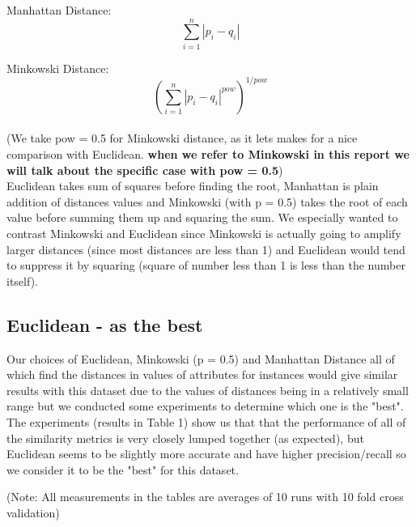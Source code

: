 Manhattan Distance:
\begin{equation}
\sum_{i=1}^{n} |p_{i} - q_{i}|
\end{equation}

Minkowski Distance:
\begin{equation}
{(\sum_{i=1}^{n} {|p_{i} - q_{i}|}^{pow})}^{1/pow}
\end{equation}
\\
(We take pow = 0.5 for Minkowski distance, as it lets makes for a nice comparison with Euclidean. {\bf when we refer to Minkowski in this report we will talk about the specific case with pow = 0.5}) \\

Euclidean takes sum of squares before finding the root, Manhattan is plain addition of distances values and Minkowski (with p = 0.5) takes the root of each value before summing them up and squaring the sum. We especially wanted to contrast Minkowski and Euclidean since Minkowski is actually going to amplify larger distances (since most distances are less than 1) and Euclidean would tend to suppress it by squaring (square of number less than 1 is less than the number itself). 


\subsection{Euclidean - as the best}

Our choices of Euclidean, Minkowski (p = 0.5) and Manhattan Distance all of which find the distances in values of attributes for instances would give similar results with this dataset due to the values of distances being in a relatively small range but we conducted some experiments to determine which one is the "best". The experiments (results in Table 1) show us that that the performance of all of the similarity metrics is very closely lumped together (as expected), but Euclidean seems to be slightly more accurate and have higher precision/recall so we consider it to be the "best" for this dataset.

(Note: All measurements in the tables are averages of 10 runs with 10 fold cross validation)

